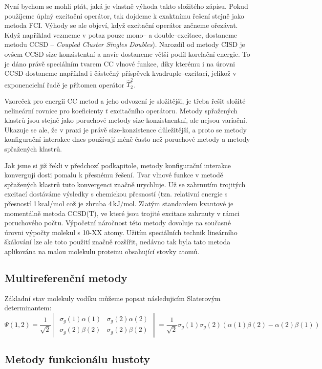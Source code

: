 Nyní bychom se mohli ptát, jaká je vlastně výhoda takto složitého zápisu.
Pokud použíjeme úplný excitační operátor, tak dojdeme k exaktnímu řešení stejně jako metoda FCI.
Výhody se ale objeví, když excitační operátor začneme ořezávat. Když například vezmeme v potaz pouze mono-- a double--excitace, dostaneme metodu CCSD -- \textit{Coupled Cluster Singles Doubles}).
Narozdíl od metody CISD je ovšem CCSD size-konzistentní a navíc dostaneme větší podíl korelační energie.
To je dáno právě speciálním tvarem CC vlnové funkce, díky kterému i na úrovni CCSD dostaneme například i částečný příspěvek kvadruple--excitací, jelikož v exponencielní řadě je přítomen operátor $\hat{T}_2^2$.

Vzoreček pro energii CC metod a jeho odvození je složitějši, je třeba řešit složité nelineární rovnice pro koeficienty $t$ excitačního operátoru. Metody spřažených klastrů jsou stejně jako poruchové metody size-konzistnentní, ale nejsou variační. Ukazuje se ale, že v praxi je právě size-konzistence důležitější, a proto se metody konfigurační interakce dnes používají méně často než poruchové metody a metody spřažených klastrů.

Jak jsme si již řekli v předchozí podkapitole, metody konfigurační interakce konvergují dosti pomalu k přesnému řešení. Tvar vlnové funkce v metodě spřažených klastrů tuto konvergenci značně urychluje. Už se zahrnutím trojitých excitací dostáváme výsledky s chemickou přesností (tzn. relativní energie s přesností 1\,kcal/mol což je zhruba 4\,kJ/mol.
Zlatým standardem kvantové je momentálně metoda CCSD(T), ve které jsou trojité excitace zahrnuty v rámci poruchového počtu. Výpočetní náročnost této metody dovoluje na současné úrovni výpočty molekul s 10-XX atomy. Užitím speciálních technik lineárního škálování lze ale toto použití značně rozšířit, nedávno tak byla tato metoda aplikována na malou molekulu proteinu obsahující stovky atomů. 

\subsection{Multireferenční metody}

Základní stav molekuly vodíku můžeme popsat následujicím Slaterovým determinantem:
\begin{equation}
\Psi (1,2)=\frac{1}{\sqrt{2}}
\begin{vmatrix}
\sigma_g(1)\alpha (1) & \sigma_g(2)\alpha (2) \\
\sigma_g(2)\beta (2) & \sigma_g(2)\beta (2)
\end{vmatrix}
=\frac{1}{\sqrt{2}}\sigma_g(1)\sigma_g(2)(\alpha (1)\beta (2)-\alpha (2)\beta (1))
\end{equation}

\subsection{Metody funkcionálu hustoty}


